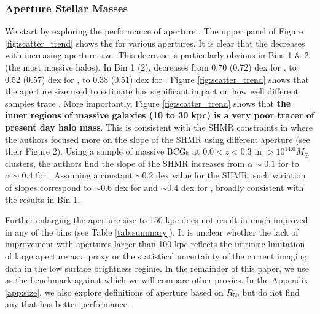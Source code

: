 \documentclass[fleqn,usenatbib,useAMS]{mnras}
\begin{document}
\subsubsection{Aperture Stellar Masses}
    \label{sec:m_aper}

    We start by exploring the performance of aperture \mstar{}. 
    The upper panel of Figure \ref{fig:scatter_trend} shows the \sigmvir{} for various apertures. 
    It is clear that the \sigmvir{} decreases with increasing aperture size. 
    This decrease is particularly obvious in Bins 1 \& 2 (the most massive halos).
    In Bin 1 (2), \sigmvir{} decreases from 0.70 (0.72) dex for , to 0.52 (0.57) dex for
    , to 0.38 (0.51) dex for . 
    Figure \ref{fig:scatter_trend} shows that the aperture size used to estimate \mstar{} has
    significant impact on how well different samples trace \mvir{}. 
    More importantly, Figure \ref{fig:scatter_trend} shows that \textbf{the inner regions of massive
    galaxies (10 to 30 kpc) is a very poor tracer of present day halo mass}. 
    This is consistent with the SHMR constraints in \citet{GoldenMarx2019} where the authors focused
    more on the slope of the SHMR using different aperture \mstar{} (see their Figure 2).
    Using a sample of massive BCGs at $0.0 < z < 0.3$ in \mvir{}$>10^{14.0} M_{\odot}$ clusters, the
    authors find the slope of the SHMR increases from $\alpha \sim 0.1$ for  to $\alpha
    \sim 0.4$ for .
    Assuming a constant \sigms{}$\sim 0.2$ dex value for the SHMR, such variation of slopes 
    correspond to \sigmvir{}$\sim 0.6$ dex for  and $\sim 0.4$ dex for ,
    broadly consistent with the \topn{} results in Bin 1. 

    Further enlarging the aperture size to 150 kpc does not result in much improved \sigmvir{} in
    any of the bins (see Table \ref{tab:summary}).
    It is unclear whether the lack of improvement with apertures larger than 100 kpc reflects the
    intrinsic limitation of large aperture \mstar{} as a \mvir{} proxy or the statistical
    uncertainty of the current imaging data in the low surface brightness regime. 
    In the remainder of this paper, we use  as the benchmark against which we will
    compare other \mvir{} proxies.
    In the Appendix \ref{app:size}, we also explore definitions of aperture \mstar{} based on
    $R_{50}$ but do not find any that has better performance.
    
\end{document}
